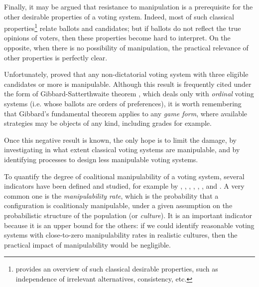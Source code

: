 

Finally, it may be argued that resistance to manipulation is a prerequisite for the other desirable properties of a voting system. Indeed, most of such classical properties\footnote{\cite{tideman2006collective} provides an overview of such classical desirable properties, such as independence of irrelevant alternatives, consistency, etc.} relate ballots and candidates; but if ballots do not reflect the true opinions of voters, then these properties become hard to interpret. On the opposite, when there is no possibility of manipulation, the practical relevance of other properties is perfectly clear.


Unfortunately, \cite{gibbard1973manipulation} proved that any non-dictatorial voting system with three eligible candidates or more is manipulable. Although this result is frequently cited under the form of Gibbard-Satterthwaite theorem \citep{satterthwaite1975strategyproofness}, which deals only with \emph{ordinal} voting systems (i.e. whose ballots are orders of preferences), it is worth remembering that Gibbard's fundamental theorem applies to any \emph{game form}, where available strategies may be objects of any kind, including grades for example.

Once this negative result is known, the only hope is to limit the damage, by investigating in what extent classical voting systems are manipulable, and by identifying processes to design less manipulable voting systems.

To quantify the degree of coalitional manipulability of a voting system, several indicators have been defined and studied, for example by \cite{lepelley1987proportion}, \cite{saari1990susceptibility}, \cite{lepelley1999kimroush}, \cite{slinko2004large}, \cite{favardin2006further}, \cite{pritchard2006averagesize}, \cite{tideman2006collective} and \cite{reyhani2009anewmeasure}. A very common one is the \emph{manipulability rate}, which is the probability that a configuration is coalitionaly manipulable, under a given assumption on the probabilistic structure of the population (or \emph{culture}). It is an important indicator because it is an upper bound for the others: if we could identify reasonable voting systems with close-to-zero manipulability rates in realistic cultures, then the practical impact of manipulability would be negligible.

